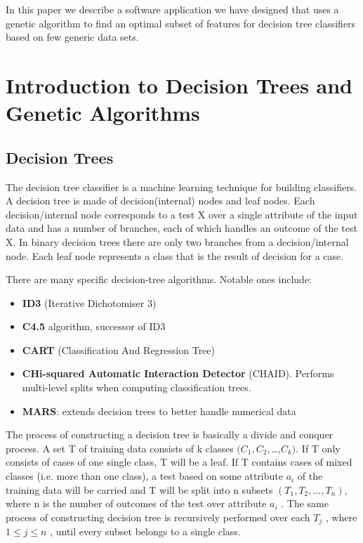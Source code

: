 \documentclass[conference]{IEEEtran}
\begin{document}
In this paper we describe a software application we have designed that uses a genetic algorithm to find an optimal subset of features for decision tree classifiers based on few generic data sets.


\section{Introduction to Decision Trees and Genetic Algorithms}
\subsection{Decision Trees}
The decision tree classifier is a machine learning technique for building classifiers. A decision tree is made of
decision(internal) nodes and leaf nodes. Each decision/internal node corresponds to
a test X over a single attribute of the input data and has a number
of branches, each of which handles an outcome of the test X. In binary decision trees there are only two branches from a decision/internal node.
Each leaf node represents a class that is the result of decision for
a case.

There are many specific decision-tree algorithms. Notable ones include:

\begin{itemize}
\item{\textbf{ID3} (Iterative Dichotomiser 3)}
\item{\textbf{C4.5} algorithm, successor of ID3}
\item{\textbf{CART} (Classification And Regression Tree)}
\item{\textbf{CHi-squared Automatic Interaction Detector }(CHAID). Performs multi-level splits when computing classification trees.}
\item{\textbf{MARS}: extends decision trees to better handle numerical data}
\end{itemize}

The process of constructing a decision tree is basically a divide and conquer process. A set T of training data consists of k
classes $( C_1, C_2,$…,$ C_k )$. If T only consists of cases of one single
class, T will be a leaf. If T contains
cases of mixed classes (i.e. more than one class), a test based on
some attribute $a_i$ of the training data will be carried and T will
be split into n subsets $( T_1 , T_2 , …, T_n)$, where n is the number of
outcomes of the test over attribute $a_i$ . The same process of
constructing decision tree is recursively performed over each $T_j$ ,
where $1\leq j \leq n$ , until every subset belongs to a single class.
\end{document}
